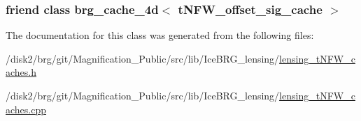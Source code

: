\subsubsection[{brg\+\_\+cache\+\_\+4d$<$ t\+N\+F\+W\+\_\+offset\+\_\+sig\+\_\+cache $>$}]{\setlength{\rightskip}{0pt plus 5cm}friend class {\bf brg\+\_\+cache\+\_\+4d}$<$ {\bf t\+N\+F\+W\+\_\+offset\+\_\+sig\+\_\+cache} $>$\hspace{0.3cm}{\ttfamily [friend]}}\label{classIceBRG_1_1tNFW__offset__sig__cache_a2eb544ffcd492a0d9b3b8b21e832c03b}


The documentation for this class was generated from the following files\+:\begin{DoxyCompactItemize}
\item 
/disk2/brg/git/\+Magnification\+\_\+\+Public/src/lib/\+Ice\+B\+R\+G\+\_\+lensing/\hyperlink{lensing__tNFW__caches_8h}{lensing\+\_\+t\+N\+F\+W\+\_\+caches.\+h}\item 
/disk2/brg/git/\+Magnification\+\_\+\+Public/src/lib/\+Ice\+B\+R\+G\+\_\+lensing/\hyperlink{lensing__tNFW__caches_8cpp}{lensing\+\_\+t\+N\+F\+W\+\_\+caches.\+cpp}\end{DoxyCompactItemize}

